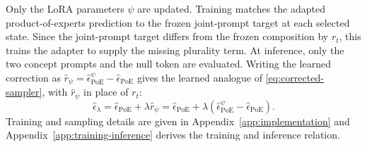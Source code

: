 Only the LoRA parameters $\psi$ are updated. Training matches the adapted product-of-experts prediction to the frozen joint-prompt target at each selected state. Since the joint-prompt target differs from the frozen composition by $r_t$, this trains the adapter to supply the missing plurality term. At inference,
only the two concept prompts and the null token are evaluated. Writing the learned correction as
$\hat r_\psi = \hat\epsilon^{\psi}_{\mathrm{PoE}} - \hat\epsilon_{\mathrm{PoE}}$ gives the learned
analogue of \eqref{eq:corrected-sampler}, with $\hat r_\psi$ in place of $r_t$:
\begin{equation}
    \hat\epsilon_\lambda
    =
    \hat\epsilon_{\mathrm{PoE}}
    +
    \lambda \hat r_\psi
    =
    \hat\epsilon_{\mathrm{PoE}}
    +
    \lambda
    \left(
    \hat\epsilon^{\psi}_{\mathrm{PoE}}
    -
    \hat\epsilon_{\mathrm{PoE}}
    \right).
    \label{eq:corrected-sampler-learned}
\end{equation}
Training and sampling details are given in Appendix~\ref{app:implementation} and Appendix~\ref{app:training-inference} derives the training and inference relation.